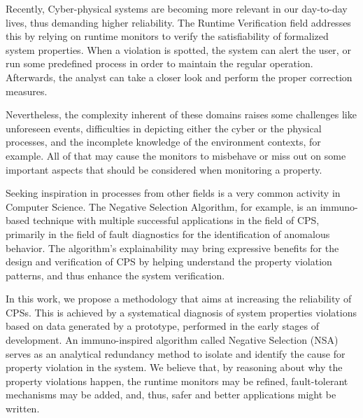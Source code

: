 Recently, Cyber-physical systems are becoming more relevant in our day-to-day lives, thus demanding higher reliability. The Runtime Verification field addresses this by relying on runtime monitors to verify the satisfiability of formalized system properties. When a violation is spotted, the system can alert the user, or run some predefined process in order to maintain the regular operation. Afterwards, the analyst can take a closer look and perform the proper correction measures.

Nevertheless, the complexity inherent of these domains raises some challenges like unforeseen events, difficulties in depicting either the cyber or the physical processes, and the incomplete knowledge of the environment contexts, for example. All of that may cause the monitors to misbehave or miss out on some important aspects that should be considered when monitoring a property.

Seeking inspiration in processes from other fields is a very common activity in Computer Science. The Negative Selection Algorithm, for example, is an immuno-based technique with multiple successful applications in the field of CPS, primarily in the field of fault diagnostics for the identification of anomalous behavior. The algorithm's explainability may bring expressive benefits for the design and verification of CPS by helping understand the property violation patterns, and thus enhance the system verification.

In this work, we propose a methodology that aims at increasing the reliability of CPSs. This is achieved by a systematical diagnosis of system properties violations based on data generated by a prototype, performed in the early stages of development. An immuno-inspired algorithm called Negative Selection (NSA) serves as an analytical redundancy method to isolate and identify the cause for property violation in the system. We believe that, by reasoning about why the property violations happen, the runtime monitors may be refined, fault-tolerant mechanisms may be added, and, thus, safer and better applications might be written.